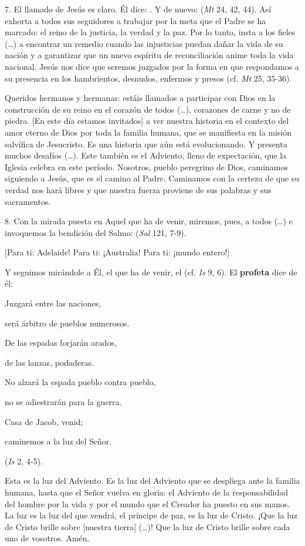 \begin{body}
	7. El llamado de Jesús es claro. Él dice: . Y de nuevo:  (\emph{Mt} 24, 42, 44). Así exhorta a todos sus seguidores a trabajar por la meta que el Padre se ha marcado: el reino de la justicia, la verdad y la paz. Por lo tanto, insta a los fieles (\ldots{}) a encontrar un remedio cuando las injusticias puedan dañar la vida de su nación y a garantizar que un nuevo espíritu de reconciliación anime toda la vida nacional. Jesús nos dice que seremos juzgados por la forma en que respondamos a su presencia en los hambrientos, desnudos, enfermos y presos (cf. \emph{Mt} 25, 35-36).

	Queridos hermanos y hermanas: estáis llamados a participar con Dios en la construcción de su reino en el corazón de todos (\ldots{}), corazones de carne y no de piedra. {[}En este día estamos invitados{]} a ver nuestra historia en el contexto del amor eterno de Dios por toda la familia humana, que se manifiesta en la misión salvífica de Jesucristo. Es una historia que aún está evolucionando. Y presenta muchos desafíos (\ldots{}). Este también es el Adviento, lleno de expectación, que la Iglesia celebra en este período. Nosotros, pueblo peregrino de Dios, caminamos siguiendo a Jesús, que es el camino al Padre. Caminamos con la certeza de que su verdad nos hará libres y que nuestra fuerza proviene de sus palabras y sus sacramentos.

	8. Con la mirada puesta en Aquel que ha de venir, miremos, pues, a todos (\ldots{}) e invoquemos la bendición del Salmo:  (\emph{Sal} 121, 7-9).

	{[}Para ti: Adelaide! Para ti: ¡Australia! Para ti: ¡mundo entero!{]}

	Y seguimos mirándole a Él, el que ha de venir, el  (cf. \emph{Is} 9, 6). El \textbf{profeta} dice de él:

	Juzgará entre las naciones,

	será árbitro de pueblos numerosos.

	De las espadas forjarán arados,

	de las lanzas, podaderas.

	No alzará la espada pueblo contra pueblo,

	no se adiestrarán para la guerra.

	Casa de Jacob, venid;

	caminemos a la luz del Señor.

	(\emph{Is} 2, 4-5).

	Esta es la luz del Adviento. Es la luz del Adviento que se despliega ante la familia humana, hasta que el Señor vuelva en gloria: el Adviento de la responsabilidad del hombre por la vida y por el mundo que el Creador ha puesto en sus manos. La luz es la luz del que vendrá, el príncipe de paz, es la luz de Cristo. ¡Que la luz de Cristo brille sobre {[}nuestra tierra{]} (\ldots{})! Que la luz de Cristo brille sobre cada uno de vosotros. Amén.
\end{body}

